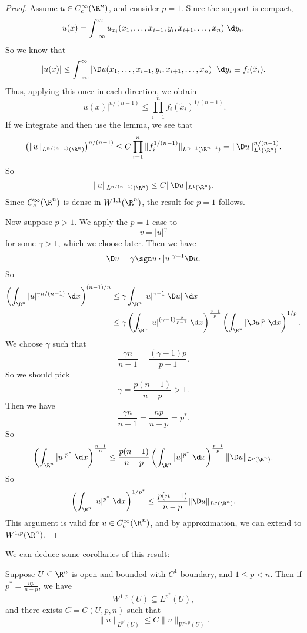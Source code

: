 \documentclass[a4paper]{article}
\begin{document}
\begin{proof}
  Assume $u \in C_c^\infty(\R^n)$, and consider $p = 1$. Since the support is compact,
  \[
    u(x) = \int_{-\infty}^{x_i} u_{x_i}(x_1 ,\ldots, x_{i - 1}, y_i, x_{i + 1}, \ldots, x_n)\;\d y_i.
  \]
  So we know that
  \[
    |u(x)| \leq \int_{-\infty}^\infty |\D u(x_1, \ldots, x_{i - 1}, y_i, x_{i + 1}, \ldots, x_n)|\;\d y_i \equiv f_i(\tilde{x}_i).
  \]
  Thus, applying this once in each direction, we obtain
  \[
    |u(x)|^{n/(n - 1)} \leq \prod_{i = 1}^n f_i(\tilde{x}_i)^{1/(n - 1)}.
  \]
  If we integrate and then use the lemma, we see that
  \[
    \left(\|u\|_{L^{n/(n - 1)}(\R^n)}\right)^{n/(n - 1)} \leq C \prod_{i = 1}^n \|f_i^{1/(n - 1)}\|_{L^{n - 1}(\R^{n - 1})} = \|\D u\|_{L^1(\R^n)}^{n/(n-1)}.
  \]
  So
  \[
    \|u\|_{L^{n/(n-1)}(\R^n)} \leq C \|\D u\|_{L^1(\R^n)}.
  \]
  Since $C^\infty_c(\R^n)$ is dense in $W^{1, 1}(\R^n)$, the result for $p = 1$ follows.

  Now suppose $p > 1$. We apply the $p = 1$ case to
  \[
    v = |u|^\gamma
  \]
  for some $\gamma > 1$, which we choose later. Then we have
  \[
    \D v = \gamma \sgn u \cdot |u|^{\gamma - 1} \D u.
  \]
  So
  \begin{align*}
    \left(\int_{\R^n} |u|^{\gamma n/(n-1)} \;\d x\right)^{(n - 1)/n} &\leq \gamma \int_{\R^n} |u|^{\gamma - 1}|\D u|\;\d x\\
    &\leq \gamma \left(\int_{\R^n} |u|^{(\gamma - 1) \frac{p}{p - 1}}\;\d x\right)^{\frac{p - 1}{p}} \left(\int_{\R^n} |\D u|^p \;\d x\right)^{1/p}.
  \end{align*}
  We choose $\gamma$ such that
  \[
    \frac{\gamma n}{n - 1} = \frac{(\gamma - 1)p}{p - 1}.
  \]
  So we should pick
  \[
    \gamma = \frac{p(n - 1)}{n - p} > 1.
  \]
  Then we have
  \[
    \frac{\gamma n}{n - 1} = \frac{np}{n - p} = p^*.
  \]
  So
  \[
    \left(\int_{\R^n} |u|^{p^*}\;\d x\right)^{\frac{n - 1}{n}} \leq \frac{p(n - 1)}{n - p}\left(\int_{\R^n} |u|^{p^*}\;\d x \right)^{\frac{p - 1}{p}} \|\D u\|_{L^p(\R^n)}.
  \]
  So
  \[
    \left(\int_{\R^n}|u|^{p^*}\;\d x\right)^{1/p^*} \leq \frac{p(n - 1)}{n - p} \|\D u\|_{L^p(\R^n)}.
  \]
  This argument is valid for $u \in C_c^\infty(\R^n)$, and by approximation, we can extend to $W^{1, p}(\R^n)$.
\end{proof}

We can deduce some corollaries of this result:
\begin{cor}
  Suppose $U \subseteq \R^n$ is open and bounded with $C^1$-boundary, and $1 \leq p < n$. Then if $p^* = \frac{np}{n - p}$, we have
  \[
    W^{1, p}(U) \subseteq L^{p^*}(U),
  \]
  and there exists $C = C(U, p, n)$ such that
  \[
    \|u\|_{L^{p^*}(U)} \leq C\|u\|_{W^{1, p}(U)}.
  \]
\end{cor}
\end{document}
